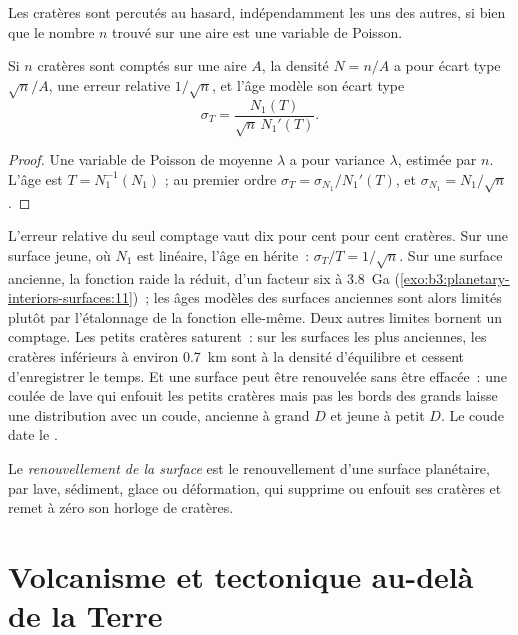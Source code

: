 Les cratères sont percutés au hasard, indépendamment les uns des autres, si bien que le nombre
$n$ trouvé sur une aire est une variable de Poisson.

\begin{proposition}\label{prop:b3:planetary-interiors-surfaces:poisson}
Si $n$ cratères sont comptés sur une aire $A$, la densité $N = n/A$ a
pour écart type $\sqrt n/A$, une erreur relative $1/\sqrt n$, et l'âge
modèle son écart type
\[
  \sigma_T = \frac{N_1(T)}{\sqrt n\,N_1'(T)} .
\]
\end{proposition}

\begin{proof}
Une variable de Poisson de moyenne $\lambda$ a pour variance $\lambda$, estimée par
$n$. L'âge est $T = N_1^{-1}(N_1)$ ; au premier ordre $\sigma_T =
\sigma_{N_1}/N_1'(T)$, et $\sigma_{N_1} = N_1/\sqrt n$.
\end{proof}

L'erreur relative du seul comptage vaut dix pour cent pour cent cratères.
Sur une surface jeune, où $N_1$ est linéaire, l'âge en hérite~: $\sigma_T/T = 1/\sqrt n$.
Sur une surface ancienne, la fonction raide la réduit, d'un facteur six à \qty{3.8}{Ga}
(\cref{exo:b3:planetary-interiors-surfaces:11})~; les âges modèles des surfaces
anciennes sont alors limités plutôt par l'étalonnage de la fonction elle-même. Deux autres limites
bornent un comptage. Les petits cratères saturent~: sur les surfaces les plus anciennes, les cratères
inférieurs à environ \qty{0.7}{km} sont à la densité d'équilibre et cessent d'enregistrer le temps. Et une surface peut être renouvelée
sans être effacée~: une coulée de lave qui enfouit les petits cratères mais pas les
bords des grands laisse une distribution avec un coude, ancienne à grand $D$ et
jeune à petit $D$. Le coude date le .
%

\begin{definition}\label{def:b3:planetary-interiors-surfaces:resurfacing}
Le \emph{renouvellement de la surface} est le renouvellement d'une surface
planétaire, par lave, sédiment, glace ou déformation, qui supprime ou enfouit ses
cratères et remet à zéro son horloge de cratères.
\end{definition}

\section{Volcanisme et tectonique au-delà de la Terre}\label{sec:b3:planetary-interiors-surfaces:volcanism}


